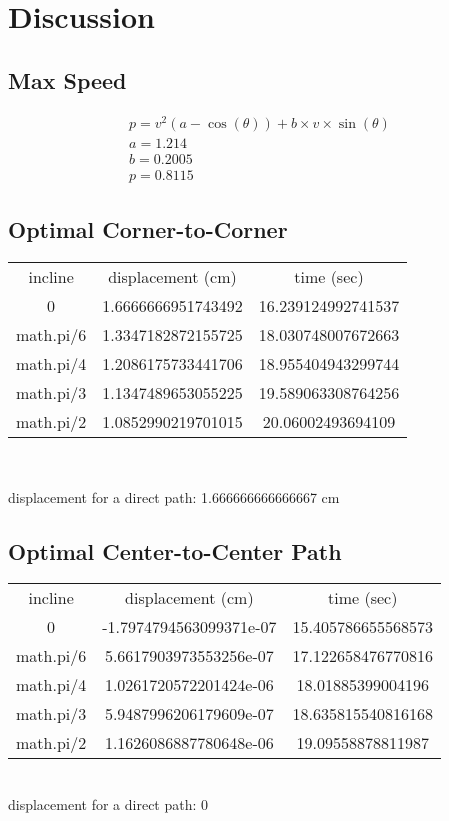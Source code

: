 \section{Discussion}

\subsection{Max Speed}

\begin{align*}
 p = v^2(a - \cos(\theta)) + b \times v \times \sin(\theta) \\
  a = 1.214 \\
  b = 0.2005 \\
  p = 0.8115
\end{align*}


\subsection{Optimal Corner-to-Corner}

\begin{center}
\begin{tabular}{ c c c }
 incline & displacement (cm) & time (sec) \\ 
 0 & 1.6666666951743492 & 16.239124992741537 \\  
 math.pi/6 & 1.3347182872155725 & 18.030748007672663 \\
 math.pi/4 & 1.2086175733441706 & 18.955404943299744 \\
 math.pi/3 & 1.1347489653055225 & 19.589063308764256 \\
 math.pi/2 & 1.0852990219701015 & 20.06002493694109
\end{tabular} \\
\end{center}
displacement for a direct path: 1.666666666666667 cm

\subsection{Optimal Center-to-Center Path}

\begin{center}
\begin{tabular}{ c c c }
 incline & displacement (cm) & time (sec) \\ 
 0 & -1.7974794563099371e-07 & 15.405786655568573 \\  
 math.pi/6 & 5.6617903973553256e-07 & 17.122658476770816 \\
 math.pi/4 & 1.0261720572201424e-06 & 18.01885399004196 \\
 math.pi/3 & 5.9487996206179609e-07 & 18.635815540816168 \\
 math.pi/2 & 1.1626086887780648e-06 & 19.09558878811987
\end{tabular} \\
displacement for a direct path: 0
\end{center}




